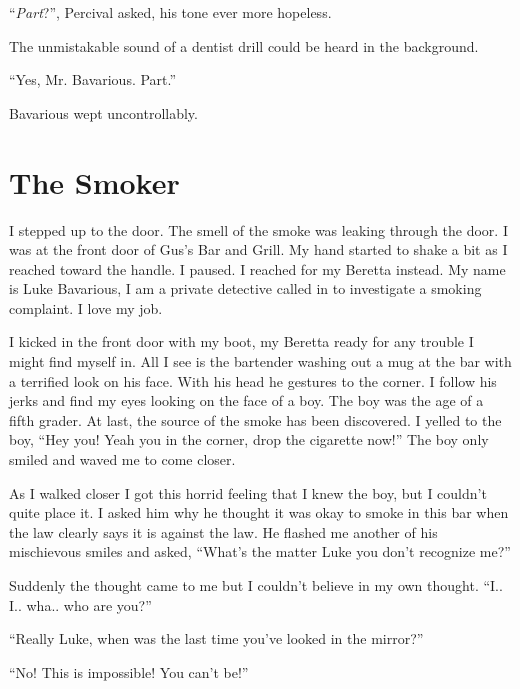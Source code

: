 ``{\em Part}?'', Percival asked, his tone ever more
hopeless.

The unmistakable sound of a dentist drill could be heard in the
background.

``Yes, Mr. Bavarious. Part.''

Bavarious wept uncontrollably. 
 





\chapter{ The Smoker}

I stepped up to the door. The smell of the smoke was leaking
through the door. I was at the front door of Gus's Bar and
Grill. My hand started to shake a bit as I reached toward the
handle. I paused. I reached for my Beretta instead. My name is Luke
Bavarious, I am a private detective called in to investigate a
smoking complaint. I love my job.



I kicked in the front door with my boot, my Beretta ready for any
trouble I might find myself in. All I see is the bartender washing
out a mug at the bar with a terrified look on his face. With his
head he gestures to the corner. I follow his jerks and find my eyes
looking on the face of a boy. The boy was the age of a fifth
grader. At last, the source of the smoke has been discovered. I
yelled to the boy, ``Hey you! Yeah you in the corner, drop the
cigarette now!'' The boy only smiled and waved me to come
closer.



As I walked closer I got this horrid feeling that I knew the boy,
but I couldn't quite place it. I asked him why he thought it
was okay to smoke in this bar when the law clearly says it is
against the law. He flashed me another of his mischievous smiles
and asked, ``What's the matter Luke you don't
recognize me?''



Suddenly the thought came to me but I couldn't believe in my
own thought. ``I.. I.. wha.. who are you?''



``Really Luke, when was the last time you've looked in
the mirror?''



``No! This is impossible! You can't be!''



